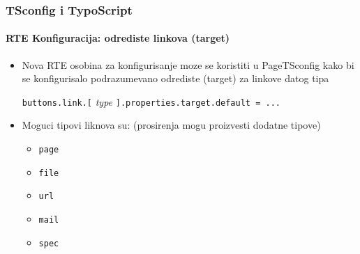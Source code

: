 \begin{frame}[fragile]
	\frametitle{TSconfig i TypoScript}
	\framesubtitle{RTE Konfiguracija: odrediste linkova (target)}

	\begin{itemize}

		\item Nova RTE osobina za konfigurisanje moze se koristiti u PageTSconfig kako bi se konfigurisalo podrazumevano odrediste (target) za linkove datog tipa\newline

			\small
				\texttt{buttons.link.[}
				\textit{type}
				\texttt{].properties.target.default = ...}
			\normalsize\newline

		\item Moguci tipovi liknova su:\newline
			\small
				(prosirenja mogu proizvesti dodatne tipove)
			\normalsize

			\begin{itemize}
				\item \texttt{page}
				\item \texttt{file}
				\item \texttt{url}
				\item \texttt{mail}
				\item \texttt{spec}
			\end{itemize}
	\end{itemize}

\end{frame}

